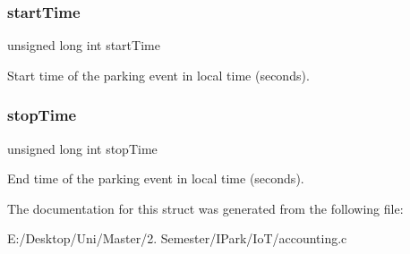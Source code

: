 \subsubsection{\texorpdfstring{start\+Time}{startTime}}
{\footnotesize\ttfamily unsigned long int start\+Time}

Start time of the parking event in local time (seconds). \mbox{\label{struct_p_a_r_k___h_i_s_t_o_r_y__t_ade4f9c9fdf82d667d8ce275da9dde4e6}} 
\subsubsection{\texorpdfstring{stop\+Time}{stopTime}}
{\footnotesize\ttfamily unsigned long int stop\+Time}

End time of the parking event in local time (seconds). 

The documentation for this struct was generated from the following file\+:\begin{DoxyCompactItemize}
\item 
E\+:/\+Desktop/\+Uni/\+Master/2. Semester/\+I\+Park/\+Io\+T/accounting.\+c\end{DoxyCompactItemize}
